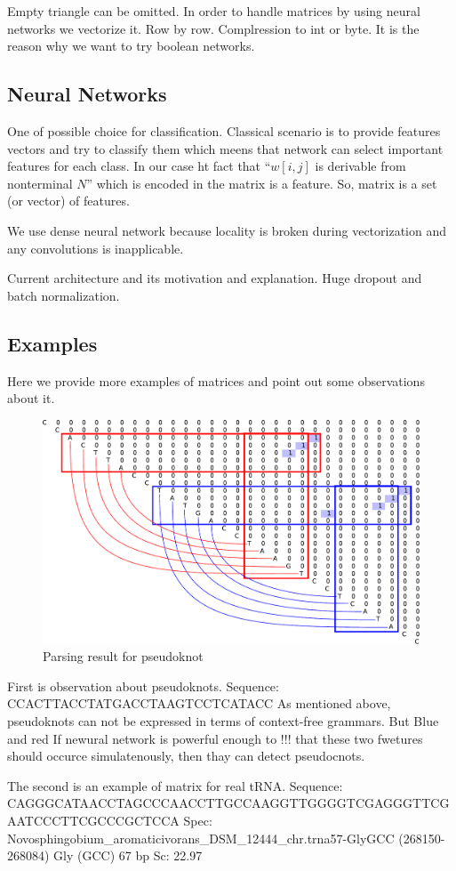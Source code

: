 \documentclass[a4paper,twoside]{article}
\begin{document}
Empty triangle can be omitted.
In order to handle matrices by using neural networks we vectorize it.
Row by row.
Complression to int or byte.
It is the reason why we want to try boolean networks.

\subsection{Neural Networks}

\noindent One of possible choice for classification.
Classical scenario is to provide features vectors and try to classify them which meens that network can select important features for each class.
In our case ht fact that ``$w[i,j]$ is derivable from nonterminal $N$'' which is encoded in the matrix is a feature.
So, matrix is a set (or vector) of features.

We use dense neural network because locality is broken during vectorization and any convolutions is inapplicable.

Current architecture and its motivation and explanation.
Huge dropout and batch normalization.

\subsection{Examples}
\label{sec:examples}

\noindent Here we provide more examples of matrices and point out some observations about it.

\begin{figure}
\centering
\includegraphics[width=.5\textwidth]{figures/5.pdf}
\caption{Parsing result for pseudoknot}
\label{fig:pseudoknot}
\end{figure}

First is observation about pseudoknots. 
Sequence: CCACTTACCTATGACCTAAGTCCTCATACC
As mentioned above, pseudoknots can not be expressed in terms of context-free grammars. 
But 
Blue and red
If newural network is powerful enough to !!! that these two fwetures should occurce simulatenously, then thay can detect pseudocnots.

The second is an example of matrix for real tRNA.
Sequence: CAGGGCATAACCTAGCCCAACCTTGCCAAGGTTGGGGTCGAGGGTTCGAATCCCTTCGCCCGCTCCA
Spec: Novosphingobium\_aromaticivorans\_DSM\_12444\_chr.trna57-GlyGCC (268150-268084)  Gly (GCC) 67 bp Sc: 22.97
\end{document}
